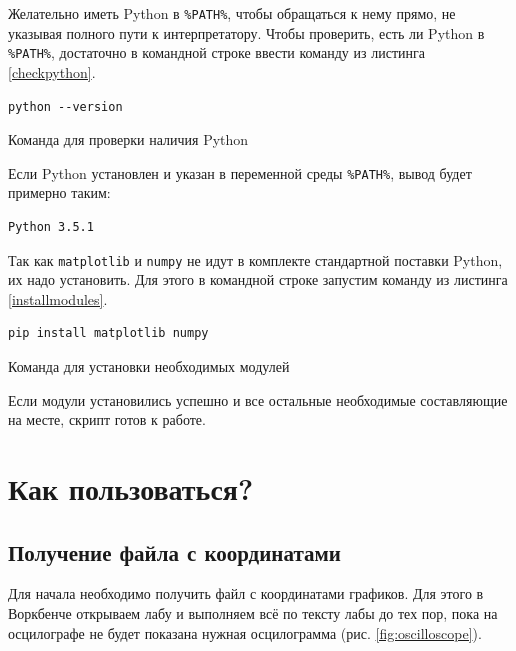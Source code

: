 \documentclass[a4paper,oneside,DIV=10,12pt]{scrartcl}
\newcommand\modulename[1]{\texttt{#1}}
\begin{document}
	Желательно иметь Python в \verb|%PATH%|, чтобы обращаться к нему прямо, не указывая полного пути к интерпретатору. Чтобы проверить, есть ли Python в \verb|%PATH%|, достаточно в командной строке ввести команду из листинга \ref{checkpython}.
	
		\begin{lstfloat}
		\begin{lstlisting}
python --version
		\end{lstlisting}
		\caption{Команда для проверки наличия Python}
		\label{checkpython}
	\end{lstfloat}
	
	Если Python установлен и указан в переменной среды \verb|%PATH%|, вывод будет примерно таким:
	
	\begin{verbatim}Python 3.5.1\end{verbatim}
	
	Так как \modulename{matplotlib} и \modulename{numpy} не идут в комплекте стандартной поставки Python, их надо установить. Для этого в командной строке запустим команду из листинга \ref{installmodules}.
	
	\begin{lstfloat}
		\begin{lstlisting}
pip install matplotlib numpy
		\end{lstlisting}
		\caption{Команда для установки необходимых модулей}
		\label{installmodules}
	\end{lstfloat}
	
	Если модули установились успешно и все остальные необходимые составляющие на месте, скрипт готов к работе.
	
	\section{Как пользоваться?}
		\subsection{Получение файла с координатами}
		Для начала необходимо получить файл с координатами графиков. Для этого в Воркбенче открываем лабу и выполняем всё по тексту лабы до тех пор, пока на осцилографе не будет показана нужная осцилограмма (рис. \ref{fig:oscilloscope}).
	
\end{document}
